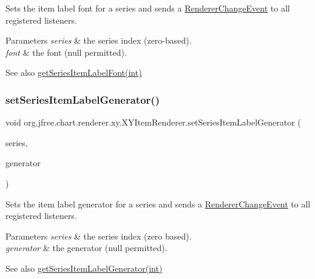Sets the item label font for a series and sends a \mbox{\hyperlink{}{Renderer\+Change\+Event}} to all registered listeners.


\begin{DoxyParams}{Parameters}
{\em series} & the series index (zero-\/based). \\
\hline
{\em font} & the font ({\ttfamily null} permitted).\\
\hline
\end{DoxyParams}
\begin{DoxySeeAlso}{See also}
\mbox{\hyperlink{interfaceorg_1_1jfree_1_1chart_1_1renderer_1_1xy_1_1_x_y_item_renderer_ab71c90261054a6698b53cb96970cca90}{get\+Series\+Item\+Label\+Font(int)}} 
\end{DoxySeeAlso}
\mbox{\label{interfaceorg_1_1jfree_1_1chart_1_1renderer_1_1xy_1_1_x_y_item_renderer_a8887feead656e9b57ce1bb2847c1421c}} 
\subsubsection{\texorpdfstring{set\+Series\+Item\+Label\+Generator()}{setSeriesItemLabelGenerator()}}
{\footnotesize\ttfamily void org.\+jfree.\+chart.\+renderer.\+xy.\+X\+Y\+Item\+Renderer.\+set\+Series\+Item\+Label\+Generator (\begin{DoxyParamCaption}\item[{int}]{series,  }\item[{\mbox{\hyperlink{interfaceorg_1_1jfree_1_1chart_1_1labels_1_1_x_y_item_label_generator}{X\+Y\+Item\+Label\+Generator}}}]{generator }\end{DoxyParamCaption})}

Sets the item label generator for a series and sends a \mbox{\hyperlink{}{Renderer\+Change\+Event}} to all registered listeners.


\begin{DoxyParams}{Parameters}
{\em series} & the series index (zero based). \\
\hline
{\em generator} & the generator ({\ttfamily null} permitted).\\
\hline
\end{DoxyParams}
\begin{DoxySeeAlso}{See also}
\mbox{\hyperlink{interfaceorg_1_1jfree_1_1chart_1_1renderer_1_1xy_1_1_x_y_item_renderer_a1e5440f518283fdbc088ce0aad7002c3}{get\+Series\+Item\+Label\+Generator(int)}} 
\end{DoxySeeAlso}


